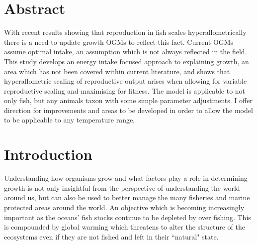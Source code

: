 \documentclass[a4paper, 11pt, hidelinks]{article} %
\begin{document}
	

	\section*{Abstract}
	\linenumbers
	 
	With recent results showing that reproduction in fish scales hyperallometrically there is a need to update growth OGMs to reflect this fact.  Current OGMs assume optimal intake, an assumption which is not always reflected in the field.  This study develops an energy intake focused approach to explaining growth, an area which has not been covered within current literature, and shows that hyperallometric scaling of reproductive output arises when allowing for variable reproductive scaling and maximising for fitness.  The model is applicable to not only fish, but any animals taxon with some simple parameter adjustments.  I offer direction for improvements and areas to be developed in order to allow the model to be applicable to any temperature range.
	
	
%	
	
	
	\nolinenumbers
	
	
	\tableofcontents
	\newpage

\section{Introduction}
	\linenumbers
	Understanding how organisms grow and what factors play a role in determining growth is not only insightful from the perspective of understanding the world around us, but can also be used to better manage the many fisheries and marine protected areas around the world.  An objective which is becoming increasingly important as the oceans' fish stocks continue to be depleted by over fishing. 
	This is compounded by global warming which threatens to alter the structure of the ecosystems even if they are not fished and left in their ``natural" state. 
	
\end{document}
